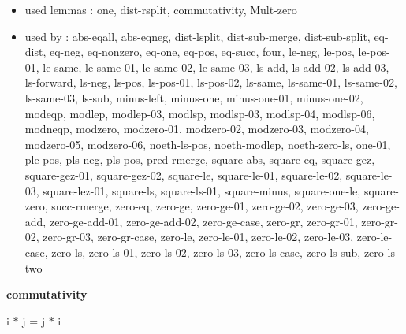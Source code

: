 \documentclass[a4paper]{article}
\begin{document}
\begin{itemize}


\item       used lemmas  : one, dist-rsplit, commutativity, Mult-zero
\item       used by      : abs-eqall, abs-eqneg, dist-lsplit, dist-sub-merge, dist-sub-split, eq-dist, eq-neg, eq-nonzero, eq-one, eq-pos, eq-succ, four, le-neg, le-pos, le-pos-01, le-same, le-same-01, le-same-02, le-same-03, ls-add, ls-add-02, ls-add-03, ls-forward, ls-neg, ls-pos, ls-pos-01, ls-pos-02, ls-same, ls-same-01, ls-same-02, ls-same-03, ls-sub, minus-left, minus-one, minus-one-01, minus-one-02, modeqp, modlep, modlep-03, modlsp, modlsp-03, modlsp-04, modlsp-06, modneqp, modzero, modzero-01, modzero-02, modzero-03, modzero-04, modzero-05, modzero-06, noeth-ls-pos, noeth-modlep, noeth-zero-ls, one-01, ple-pos, pls-neg, pls-pos, pred-rmerge, square-abs, square-eq, square-gez, square-gez-01, square-gez-02, square-le, square-le-01, square-le-02, square-le-03, square-lez-01, square-ls, square-ls-01, square-minus, square-one-le, square-zero, succ-rmerge, zero-eq, zero-ge, zero-ge-01, zero-ge-02, zero-ge-03, zero-ge-add, zero-ge-add-01, zero-ge-add-02, zero-ge-case, zero-gr, zero-gr-01, zero-gr-02, zero-gr-03, zero-gr-case, zero-le, zero-le-01, zero-le-02, zero-le-03, zero-le-case, zero-ls, zero-ls-01, zero-ls-02, zero-ls-03, zero-ls-case, zero-ls-sub, zero-ls-two

\end{itemize}

\medskip

\bigskip

{\large\bf commutativity}

\medskip

 \Fol i $*$ j = j $*$ i
\end{document}
